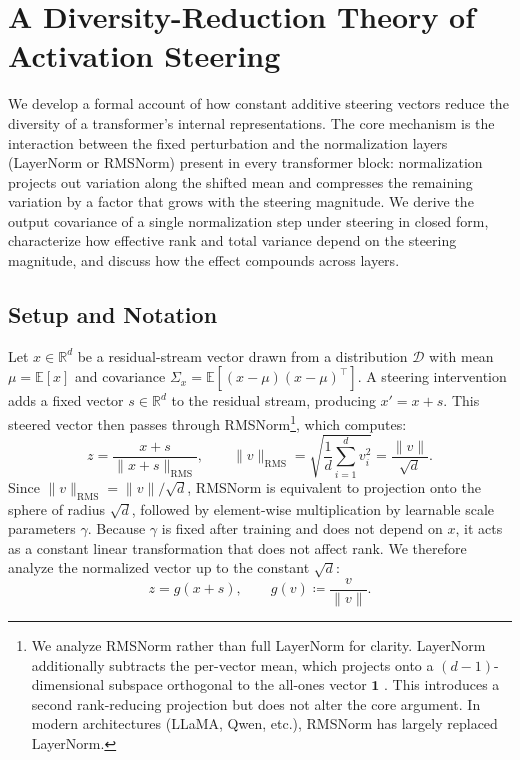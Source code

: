 \section{A Diversity-Reduction Theory of Activation Steering}
\label{sec:diversity-reduction}

We develop a formal account of how constant additive steering vectors reduce the diversity of a transformer's internal representations.
The core mechanism is the interaction between the fixed perturbation and the normalization layers (LayerNorm or RMSNorm) present in every transformer block: normalization projects out variation along the shifted mean and compresses the remaining variation by a factor that grows with the steering magnitude.
We derive the output covariance of a single normalization step under steering in closed form, characterize how effective rank and total variance depend on the steering magnitude, and discuss how the effect compounds across layers.

\subsection{Setup and Notation}

Let $x \in \mathbb{R}^d$ be a residual-stream vector drawn from a distribution $\mathcal{D}$ with mean $\mu = \mathbb{E}[x]$ and covariance $\Sigma_x = \mathbb{E}[(x - \mu)(x - \mu)^\top]$.
A steering intervention adds a fixed vector $s \in \mathbb{R}^d$ to the residual stream, producing $x' = x + s$.
This steered vector then passes through RMSNorm\footnote{%
  We analyze RMSNorm rather than full LayerNorm for clarity.
  LayerNorm additionally subtracts the per-vector mean, which projects onto a $(d{-}1)$-dimensional subspace orthogonal to the all-ones vector $\mathbf{1}$ \citep{brody2023expressivity}.
  This introduces a second rank-reducing projection but does not alter the core argument.
  In modern architectures (LLaMA, Qwen, etc.), RMSNorm has largely replaced LayerNorm.
}, which computes:
%
\begin{equation}
  z = \frac{x + s}{\|x + s\|_{\mathrm{RMS}}},
  \qquad
  \|v\|_{\mathrm{RMS}} = \sqrt{\frac{1}{d}\sum_{i=1}^{d} v_i^2}
  = \frac{\|v\|}{\sqrt{d}}.
  \label{eq:rmsnorm}
\end{equation}
%
Since $\|v\|_{\mathrm{RMS}} = \|v\| / \sqrt{d}$, RMSNorm is equivalent to projection onto the sphere of radius $\sqrt{d}$, followed by element-wise multiplication by learnable scale parameters $\gamma$.
Because $\gamma$ is fixed after training and does not depend on $x$, it acts as a constant linear transformation that does not affect rank.
We therefore analyze the normalized vector up to the constant $\sqrt{d}$:
%
\begin{equation}
  z = g(x + s), \qquad g(v) \coloneqq \frac{v}{\|v\|}.
  \label{eq:sphere-projection}
\end{equation}

